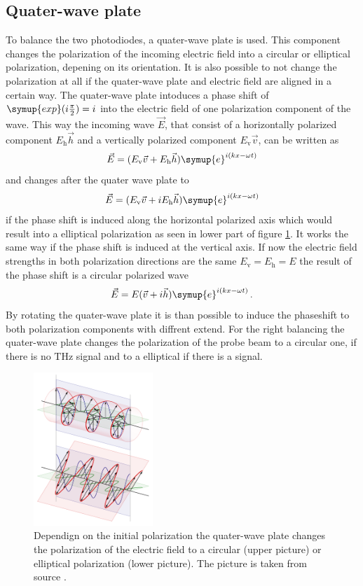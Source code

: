 \subsection{Quater-wave plate}
\label{sec:qwp}
To balance the two photodiodes, a quater-wave plate is used.
This component changes the polarization of the incoming electric field into a circular or elliptical polarization, depening on its orientation.
It is also possible to not change the polarization at all if the quater-wave plate and electric field are aligned in a certain way.
The quater-wave plate intoduces a phase shift of $\symup{exp}(i\frac{\pi}{2}) = i$ into the electric field of one polarization component of the wave.
This way the incoming wave $\vec{E}$, that consist of a horizontally polarized component $E_\text{h}\vec{h}$ and a vertically polarized component $E_\text{v}\vec{v}$, can be written as
\begin{equation}
    \vec{E} = (E_\text{v}\vec{v} + E_\text{h}\vec{h})\symup{e}^{i(kx-\omega t)}
\end{equation}
and changes after the quater wave plate to 
\begin{equation}
    \vec{E} = (E_\text{v}\vec{v} + i E_\text{h}\vec{h})\symup{e}^{i(kx-\omega t)}
\end{equation}
if the phase shift is induced along the horizontal polarized axis which would result into a elliptical polarization as seen in lower part of figure \ref{fig:qwp}.
It works the same way if the phase shift is induced at the vertical axis.
If now the electric field strengths in both polarization directions are the same $E_\text{v} = E_\text{h} = E$ the result of the phase shift is a circular polarized wave
\begin{equation}
    \vec{E} = E(\vec{v} + i\vec{h})\symup{e}^{i(kx-\omega t)} \, .
\end{equation}
By rotating the quater-wave plate it is than possible to induce the phaseshift to both polarization components with diffrent extend.
For the right balancing the quater-wave plate changes the polarization of the probe beam to a circular one, if there is no $\si{\tera\hertz}$ signal and to a elliptical if there is a signal.
\begin{figure}
    \centering
    \includegraphics[width=0.4\textwidth]{refferenced_pic/qwp.png}
    \caption{Dependign on the initial polarization the quater-wave plate changes the polarization of the electric field to a circular (upper picture) or elliptical polarization (lower picture).
    The picture is taken from source \cite{qwp}.}
    \label{fig:qwp}
\end{figure}
\FloatBarrier
